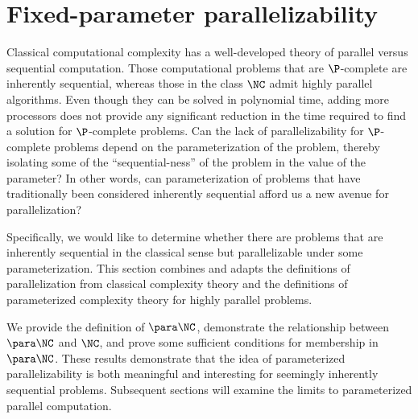 \section{Fixed-parameter parallelizability}
\label{sec:pcompletefpp}

%
%
%
Classical computational complexity has a well-developed theory of parallel versus sequential computation.
Those computational problems that are $\P$-complete are inherently sequential, whereas those in the class $\NC$ admit highly parallel algorithms.
Even though they can be solved in polynomial time, adding more processors does not provide any significant reduction in the time required to find a solution for $\P$-complete problems.
%
%
Can the lack of parallelizability for $\P$-complete problems depend on the parameterization of the problem, thereby isolating some of the ``sequential-ness'' of the problem in the value of the parameter?
In other words, can parameterization of problems that have traditionally been considered inherently sequential afford us a new avenue for parallelization?

%
%
%
Specifically, we would like to determine whether there are problems that are inherently sequential in the classical sense but parallelizable under some parameterization.
%
%
%
This section combines and adapts the definitions of parallelization from classical complexity theory and the definitions of parameterized complexity theory for highly parallel problems.
%

%
%
%
We provide the definition of $\para \NC$, demonstrate the relationship between $\para \NC$ and $\NC$, and prove some sufficient conditions for membership in $\para \NC$.
%
%
%
These results demonstrate that the idea of parameterized parallelizability is both meaningful and interesting for seemingly inherently sequential problems.
%
%
Subsequent sections will examine the limits to parameterized parallel computation.


